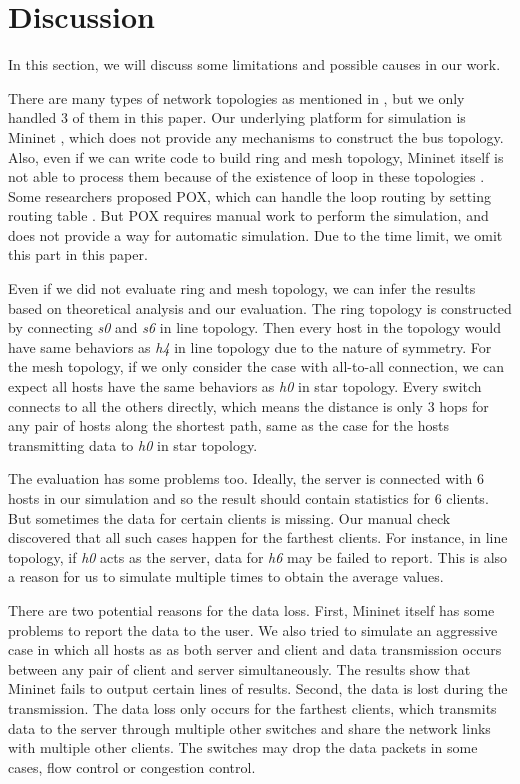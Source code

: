 \section{Discussion} \label{sec:discussion}

In this section, we will discuss some limitations and possible causes in our work.

There are many types of network topologies as mentioned in \cite{NetworkTopo:wiki},
but we only handled 3 of them in this paper. Our underlying platform for simulation
is Mininet \cite{Mininet:official}, which does not provide any mechanisms to construct
the bus topology. Also, even if we can write code to build ring and mesh topology,
Mininet itself is not able to process them because of the existence of loop in these
topologies \cite{MininetFAQ:web}. Some researchers proposed POX, which can handle the
loop routing by setting routing table \cite{POX:web}. But POX requires manual work 
to perform the simulation, and does not provide a way for automatic simulation. 
Due to the time limit, we omit this part in this paper.

Even if we did not evaluate ring and mesh topology, we can infer the results based on 
theoretical analysis and our evaluation. The ring topology is constructed by connecting
{\it s0} and {\it s6} in line topology. Then every host in the topology would have same 
behaviors as {\it h4} in line topology due to the nature of symmetry. 
For the mesh topology, if we only consider the case with all-to-all connection, we can
expect all hosts have the same behaviors as {\it h0} in star topology. Every switch 
connects to all the others directly, which means the distance  is only 3 hops for any pair
of hosts along the shortest path, same as the case for the hosts transmitting data to 
{\it h0} in star topology. 

The evaluation has some problems too. Ideally, the server is connected with 6 hosts in
our simulation and so the result should contain statistics for 6 clients. But sometimes
the data for certain clients is missing. Our manual check discovered that all such cases 
happen for the farthest clients. For instance, in line topology, if {\it h0} acts as the 
server, data for {\it h6} may be failed to report. This is also a reason for us to 
simulate multiple times to obtain the average values. 

There are two potential reasons for the data loss. First, Mininet itself has some problems 
to report the data to the user. We also tried to simulate an aggressive case in which all 
hosts as as both server and client and data transmission occurs between any pair of 
client and server simultaneously. The results show that Mininet fails to output certain lines
of results. Second, the data is lost during the transmission. The data loss only occurs for 
the farthest clients, which transmits data to the server through multiple other switches and 
share the network links with multiple other clients. 
The switches may drop the data packets in some cases, \eg flow control or congestion control.

